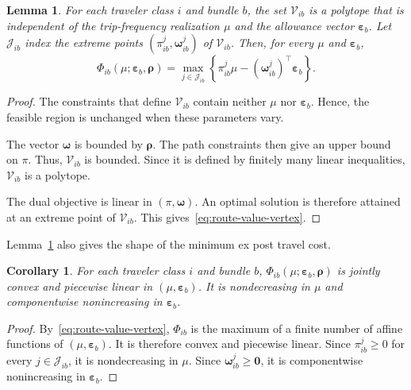 \documentclass{article}
\newtheorem{lemma}{Lemma}
\newtheorem{corollary}{Corollary}
\begin{document}
\begin{lemma}
For each traveler class $i$ and bundle $b$, the set
$\mathcal V_{ib}$ is a polytope that is independent of the
trip-frequency realization $\mu$ and the allowance vector
$\bm\varepsilon_b$. Let $\mathcal J_{ib}$ index the extreme points
$(\pi_{ib}^j,\bm\omega_{ib}^j)$ of $\mathcal V_{ib}$. Then, for every
$\mu$ and $\bm\varepsilon_b$,
\begin{equation}
    \Phi_{ib}(\mu;\bm\varepsilon_b,\bm\rho)
    =
    \max_{j\in\mathcal J_{ib}}
    \left\{
        \pi_{ib}^j\mu
        -
        (\bm\omega_{ib}^j)^{\top}\bm\varepsilon_b
    \right\}.
    \label{eq:route-value-vertex}
\end{equation}
\label{lem:fixed-dual-geometry}
\end{lemma}

\begin{proof}
The constraints that define $\mathcal V_{ib}$ contain neither $\mu$
nor $\bm\varepsilon_b$. Hence, the feasible region is unchanged when
these parameters vary.

The vector $\bm\omega$ is bounded by $\bm\rho$. The path constraints
then give an upper bound on $\pi$. Thus, $\mathcal V_{ib}$ is bounded.
Since it is defined by finitely many linear inequalities,
$\mathcal V_{ib}$ is a polytope.

The dual objective is linear in $(\pi,\bm\omega)$. An optimal solution
is therefore attained at an extreme point of $\mathcal V_{ib}$. This
gives~\eqref{eq:route-value-vertex}.
\end{proof}

Lemma~\ref{lem:fixed-dual-geometry} also gives the shape of the minimum
ex post travel cost.

\begin{corollary}
For each traveler class $i$ and bundle $b$,
$\Phi_{ib}(\mu;\bm\varepsilon_b,\bm\rho)$ is jointly convex and
piecewise linear in $(\mu,\bm\varepsilon_b)$. It is nondecreasing in
$\mu$ and componentwise nonincreasing in $\bm\varepsilon_b$.
\label{cor:realized-valuation-properties}
\end{corollary}

\begin{proof}
By~\eqref{eq:route-value-vertex}, $\Phi_{ib}$ is the maximum of a finite
number of affine functions of $(\mu,\bm\varepsilon_b)$. It is therefore
convex and piecewise linear. Since $\pi_{ib}^j\geq0$ for every
$j\in\mathcal J_{ib}$, it is nondecreasing in $\mu$. Since
$\bm\omega_{ib}^j\geq\bm0$, it is componentwise nonincreasing in
$\bm\varepsilon_b$.
\end{proof}
\end{document}
